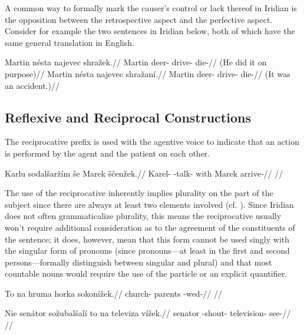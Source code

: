 A common way to formally mark the causer's control or lack thereof in Iridian is the opposition between the retrospective aspect and the perfective aspect. Consider for example the two sentences in Iridian below, both of which have the same general translation in English.

\pex
\a
\begingl
	\gla Martin nésta najevec shražek.//
	\glb Martin deer- drive- die-//
	\glft {} (He did it on purpose)//
\endgl
\a
\begingl
	\gla Martin nésta najevec shražaní.//
	\glb Martin deer- drive- die-//
	\glft {} (It was an accident.)//
\endgl
\xe

\subsection{Reflexive and Reciprocal Constructions}

The reciprocative prefix  is used with the agentive voice to indicate that an action is performed by the agent and the patient on each other.

\pex
\begingl
\gla Karlu sodalšar\v{z}ím še Marek ščenžek.//
\glb Karel- -talk- with Marek arrive-//
\glft {}//
\endgl
\xe

The use of the reciprocative inherently implies plurality on the part of the subject since there are always at least two elements involved (cf. \cite[255]{tesniere1965}). Since Iridian does not often grammaticalize plurality, this means the reciprocative usually won't require additional consideration as to the agreement of the constituents of the sentence; it does, however, mean that this form cannot be used singly with the singular form of pronouns (since pronouns---at least in the first and second persons---formally distinguish between singular and plural) and that most countable nouns would require the use of the particle  or an explicit quantifier.

\pex
\begingl
\gla To na hruma horka sokonížek.//
\glb {}  church- parents -wed-//
\glft {}//
\endgl
\xe

\pex
\begingl
\gla Nie senátor sožubalšalí to na televiza vížek.//
\glb {} senator -shout-   television- see-//
\glft {}//
\endgl
\xe

